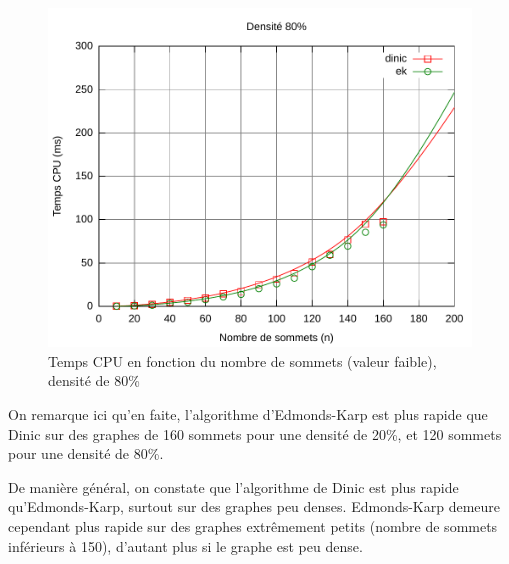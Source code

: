 \begin{figure}[h!]
\begin{center}
\includegraphics[width=\textwidth]{files/c80_low}
\end{center}
\caption{Temps CPU en fonction du nombre de sommets (valeur faible), densité de 80\%}
\end{figure}

On remarque ici qu'en faite, l'algorithme d'Edmonds-Karp est plus rapide que Dinic sur des graphes de 160 sommets pour une densité de 20\%, et 120 sommets pour une densité de 80\%.

De manière général, on constate que l'algorithme de Dinic est plus rapide qu'Edmonds-Karp, surtout sur des graphes peu denses. Edmonds-Karp demeure cependant plus rapide sur des graphes extrêmement petits (nombre de sommets inférieurs à 150), d'autant plus si le graphe est peu dense.